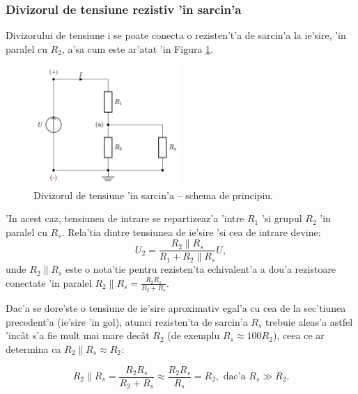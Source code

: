 \subsubsection*{\color{blue} Divizorul de tensiune rezistiv 'in sarcin'a} %

Divizorului de tensiune i se poate conecta o rezisten't'a de sarcin'a la ie'sire, 'in paralel cu $R_2$, a'sa cum este ar'atat 'in Figura \ref{fig:divizor_sarcina_schema}.

\begin{figure}[!b]
	\centering
		\includegraphics[width=0.5\textwidth]{laborator_01/figuri/scheme_divizor_sarcina}
	\caption{Divizorul de tensiune 'in sarcin'a -- schema de principiu.}
	\label{fig:divizor_sarcina_schema}
\end{figure}

'In acest caz, tensiunea de intrare se repartizeaz'a 'intre $R_1$ 'si grupul $R_2$ 'in paralel cu $R_s$. Rela'tia dintre tensiunea de ie'sire 'si cea de intrare devine:
\begin{equation} \label{eq:tensiune_iesire_sarcina}
U_2 = \frac{R_2\parallel R_s}{R_1+R_2\parallel R_s}U,
\end{equation}
unde $R_2\parallel R_s$ este o nota'tie pentru rezisten'ta echivalent'a a dou'a rezistoare conectate 'in paralel $R_2\parallel R_s = \frac{R_2R_s}{R_2+R_s}$.

Dac'a se dore'ste o tensiune de ie'sire aproximativ egal'a cu cea de la sec'tiunea precedent'a (ie'sire 'in gol), atunci rezisten'ta de sarcin'a $R_s$ trebuie aleas'a astfel 'inc\^at s'a fie mult mai mare dec\^at $R_2$ (de exemplu $R_s \approx 100R_2$), ceea ce ar determina ca $R_2\parallel R_s \approx R_2$:

\begin{equation}\label{eq:sarcina}
R_2 \parallel R_s = \frac{R_2 R_s}{R_2+R_s}\approx \frac{R_2 R_s}{R_s}=R_2, \text{ dac'a } R_s \gg R_2.
\end{equation}

